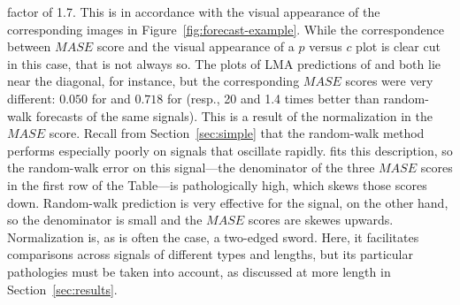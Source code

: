 factor of 1.7.  This is in accordance with the
visual appearance of the corresponding images in
Figure~\ref{fig:forecast-example}.  While the correspondence between
$MASE$ score and the visual appearance of a $p$ versus $c$ plot is
clear cut in this case, that is not always so.  The plots of LMA
predictions of \col and \svdfive both lie near the diagonal, for
instance, but the corresponding $MASE$ scores were very different:
$0.050$ for \col and $0.718$ for \svdfive (resp., 20 and 1.4 times
better than random-walk forecasts of the same signals).  This is a
result of the normalization in the $MASE$ score.  Recall from
Section~\ref{sec:simple} that the random-walk method performs
especially poorly on signals that oscillate rapidly.  \col fits this
description, so the random-walk error on this signal---the denominator
of the three $MASE$ scores in the first row of the Table---is
pathologically high, which skews those scores down.  Random-walk
prediction is very effective for the \svdfive signal, on the other
hand, so the denominator is small and the $MASE$ scores are skewes
upwards.  Normalization is, as is often the case, a two-edged sword.
Here, it facilitates comparisons across signals of different types and
lengths, but its particular pathologies must be taken into account, as
discussed at more length in Section~\ref{sec:results}.




